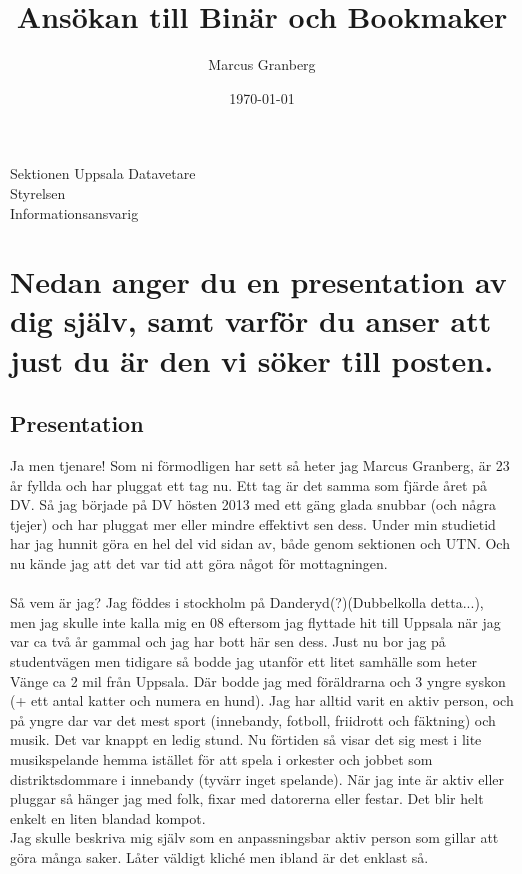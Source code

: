 \documentclass[a4paper]{article}
\title{Ansökan till Binär och Bookmaker}
\author{Marcus Granberg}
\date{\today}
\begin{document}
\maketitle

\begin{center}
Sektionen Uppsala Datavetare \\ Styrelsen \\ Informationsansvarig
\end{center}

\newpage

\section{Nedan anger du en presentation av dig själv, samt varför du anser att just du är den vi söker till posten.}

\subsection{Presentation}
Ja men tjenare! Som ni förmodligen har sett så heter jag Marcus Granberg, är 23 år fyllda och har pluggat ett tag nu. 
Ett tag är det samma som fjärde året på 
DV. Så jag började på DV hösten 2013 med ett gäng glada snubbar (och några tjejer) och har pluggat mer eller mindre 
effektivt sen dess. Under min studietid 
har jag hunnit göra en hel del vid sidan av, både genom sektionen och UTN. Och nu kände jag att det var tid att göra 
något för mottagningen.  \\ \\
Så vem är jag? Jag föddes i stockholm på Danderyd(?)(Dubbelkolla detta...), 
men jag skulle inte kalla mig en 08 eftersom jag flyttade hit till Uppsala när jag var ca två år gammal och jag har 
bott här sen dess. Just nu bor jag på 
studentvägen men tidigare så bodde jag utanför ett litet samhälle som heter Vänge ca 2 mil från Uppsala. Där bodde jag 
med föräldrarna och 3 yngre syskon (+ ett 
antal katter och numera en hund). Jag har alltid varit en aktiv person, och på yngre dar var det mest sport 
(innebandy, fotboll, friidrott och fäktning) och musik. Det var knappt en ledig stund. Nu förtiden så visar det sig 
mest i lite musikspelande hemma istället för att spela i orkester och jobbet som distriktsdommare i innebandy (tyvärr 
inget spelande). När jag inte är aktiv eller pluggar så hänger jag med folk, fixar med datorerna eller festar. Det 
blir helt enkelt en liten blandad kompot.  \\
Jag skulle beskriva mig själv som en anpassningsbar aktiv person som gillar att göra många saker. Låter väldigt kliché 
men ibland är det enklast så. 
\end{document}

